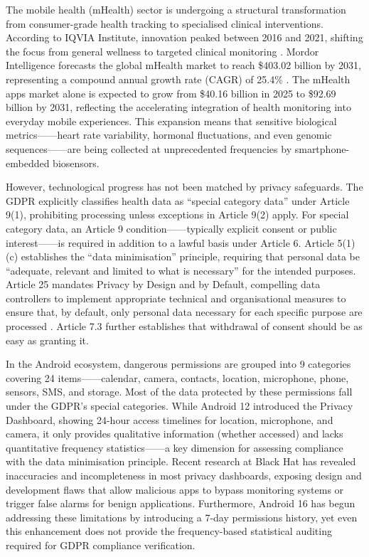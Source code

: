 The mobile health (mHealth) sector is undergoing a structural transformation from consumer-grade health tracking to specialised clinical interventions. According to IQVIA Institute, innovation peaked between 2016 and 2021, shifting the focus from general wellness to targeted clinical monitoring \cite{iqvia2021}. Mordor Intelligence forecasts the global mHealth market to reach \$403.02 billion by 2031, representing a compound annual growth rate (CAGR) of 25.4\% \cite{mordor2023}. The mHealth apps market alone is expected to grow from \$40.16 billion in 2025 to \$92.69 billion by 2031, reflecting the accelerating integration of health monitoring into everyday mobile experiences. This expansion means that sensitive biological metrics——heart rate variability, hormonal fluctuations, and even genomic sequences——are being collected at unprecedented frequencies by smartphone-embedded biosensors.

However, technological progress has not been matched by privacy safeguards. The GDPR explicitly classifies health data as ``special category data'' under Article 9(1), prohibiting processing unless exceptions in Article 9(2) apply. For special category data, an Article 9 condition——typically explicit consent or public interest——is required in addition to a lawful basis under Article 6. Article 5(1)(c) establishes the ``data minimisation'' principle, requiring that personal data be ``adequate, relevant and limited to what is necessary'' for the intended purposes. Article 25 mandates Privacy by Design and by Default, compelling data controllers to implement appropriate technical and organisational measures to ensure that, by default, only personal data necessary for each specific purpose are processed \cite{eurlex2016}. Article 7.3 further establishes that withdrawal of consent should be as easy as granting it.

In the Android ecosystem, dangerous permissions are grouped into 9 categories covering 24 items——calendar, camera, contacts, location, microphone, phone, sensors, SMS, and storage. Most of the data protected by these permissions fall under the GDPR's special categories. While Android 12 introduced the Privacy Dashboard, showing 24-hour access timelines for location, microphone, and camera, it only provides qualitative information (whether accessed) and lacks quantitative frequency statistics——a key dimension for assessing compliance with the data minimisation principle. Recent research at Black Hat has revealed inaccuracies and incompleteness in most privacy dashboards, exposing design and development flaws that allow malicious apps to bypass monitoring systems or trigger false alarms for benign applications. Furthermore, Android 16 has begun addressing these limitations by introducing a 7-day permissions history, yet even this enhancement does not provide the frequency-based statistical auditing required for GDPR compliance verification.

